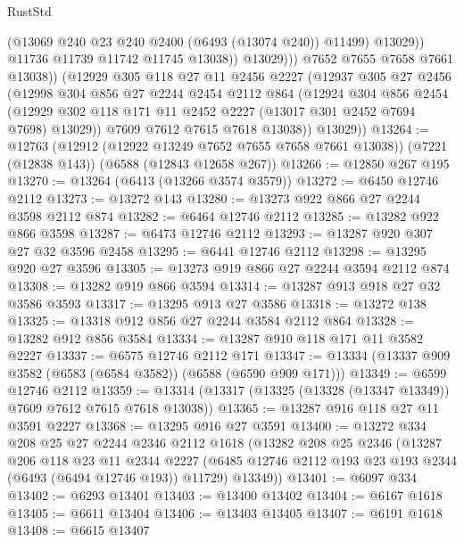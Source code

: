 \begin{lexlean}{RustStd}
\begin{coremodule}
                        (@13069 @240 @23 @240 @2400 (@6493 (@13074 @240)) @11499)
                        @13029))
                    @11736
                    @11739
                    @11742
                    @11745
                    @13038))
                @13029)))
          @7652
          @7655
          @7658
          @7661
          @13038))
      (@12929
        @305
        @118
        @27
        @11
        @2456
        @2227
        (@12937
          @305
          @27
          @2456
          (@12998
            @304
            @856
            @27
            @2244
            @2454
            @2112
            @864
            (@12924
              @304
              @856
              @2454
              (@12929 @302 @118 @171 @11 @2452 @2227 (@13017 @301 @2452 @7694 @7698) @13029))
            @7609
            @7612
            @7615
            @7618
            @13038))
        @13029))
@13264 := @12763
    (@12912 (@12922 @13249 @7652 @7655 @7658 @7661 @13038))
    (@7221 (@12838 @143))
    (@6588 (@12843 @12658 @267))
@13266 := @12850 @267 @195
@13270 := @13264 (@6413 (@13266 @3574 @3579))
@13272 := @6450 @12746 @2112
@13273 := @13272 @143
@13280 := @13273 @922 @866 @27 @2244 @3598 @2112 @874
@13282 := @6464 @12746 @2112
@13285 := @13282 @922 @866 @3598
@13287 := @6473 @12746 @2112
@13293 := @13287 @920 @307 @27 @32 @3596 @2458
@13295 := @6441 @12746 @2112
@13298 := @13295 @920 @27 @3596
@13305 := @13273 @919 @866 @27 @2244 @3594 @2112 @874
@13308 := @13282 @919 @866 @3594
@13314 := @13287 @913 @918 @27 @32 @3586 @3593
@13317 := @13295 @913 @27 @3586
@13318 := @13272 @138
@13325 := @13318 @912 @856 @27 @2244 @3584 @2112 @864
@13328 := @13282 @912 @856 @3584
@13334 := @13287 @910 @118 @171 @11 @3582 @2227
@13337 := @6575 @12746 @2112 @171
@13347 := @13334 (@13337 @909 @3582 (@6583 (@6584 @3582)) (@6588 (@6590 @909 @171)))
@13349 := @6599 @12746 @2112
@13359 := @13314 (@13317 (@13325 (@13328 (@13347 @13349)) @7609 @7612 @7615 @7618 @13038))
@13365 := @13287 @916 @118 @27 @11 @3591 @2227
@13368 := @13295 @916 @27 @3591
@13400 := @13272
    @334
    @208
    @25
    @27
    @2244
    @2346
    @2112
    @1618
    (@13282
      @208
      @25
      @2346
      (@13287
        @206
        @118
        @23
        @11
        @2344
        @2227
        (@6485 @12746 @2112 @193 @23 @193 @2344 (@6493 (@6494 @12746 @193)) @11729)
        @13349))
@13401 := @6097 @334
@13402 := @6293 @13401
@13403 := @13400 @13402
@13404 := @6167 @1618
@13405 := @6611 @13404
@13406 := @13403 @13405
@13407 := @6191 @1618
@13408 := @6615 @13407

\end{coremodule}
\end{lexlean}
